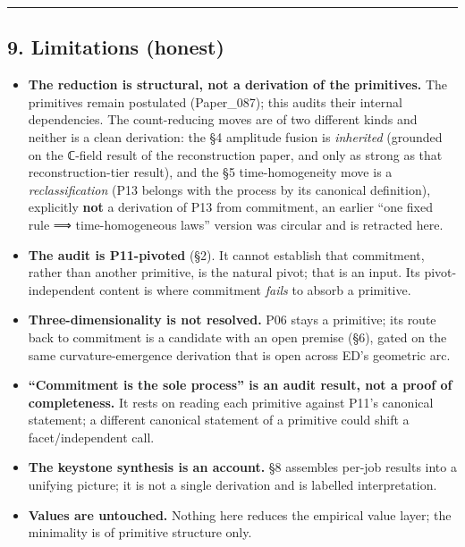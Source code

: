\documentclass[
  11pt,
]{article}
\providecommand{\tightlist}{%
  \setlength{\itemsep}{0pt}\setlength{\parskip}{0pt}}
\begin{document}
\begin{center}\rule{0.5\linewidth}{0.5pt}\end{center}

\subsection{9. Limitations (honest)}\label{limitations-honest}

\begin{itemize}
\tightlist
\item
  \textbf{The reduction is structural, not a derivation of the
  primitives.} The primitives remain postulated (Paper\_087); this
  audits their internal dependencies. The count-reducing moves are of
  two different kinds and neither is a clean derivation: the §4
  amplitude fusion is \emph{inherited} (grounded on the ℂ-field result
  of the reconstruction paper, and only as strong as that
  reconstruction-tier result), and the §5 time-homogeneity move is a
  \emph{reclassification} (P13 belongs with the process by its canonical
  definition), explicitly \textbf{not} a derivation of P13 from
  commitment, an earlier ``one fixed rule ⟹ time-homogeneous laws''
  version was circular and is retracted here.
\item
  \textbf{The audit is P11-pivoted} (§2). It cannot establish that
  commitment, rather than another primitive, is the natural pivot; that
  is an input. Its pivot-independent content is where commitment
  \emph{fails} to absorb a primitive.
\item
  \textbf{Three-dimensionality is not resolved.} P06 stays a primitive;
  its route back to commitment is a candidate with an open premise (§6),
  gated on the same curvature-emergence derivation that is open across
  ED's geometric arc.
\item
  \textbf{``Commitment is the sole process'' is an audit result, not a
  proof of completeness.} It rests on reading each primitive against
  P11's canonical statement; a different canonical statement of a
  primitive could shift a facet/independent call.
\item
  \textbf{The keystone synthesis is an account.} §8 assembles per-job
  results into a unifying picture; it is not a single derivation and is
  labelled interpretation.
\item
  \textbf{Values are untouched.} Nothing here reduces the empirical
  value layer; the minimality is of primitive structure only.
\end{itemize}
\end{document}
